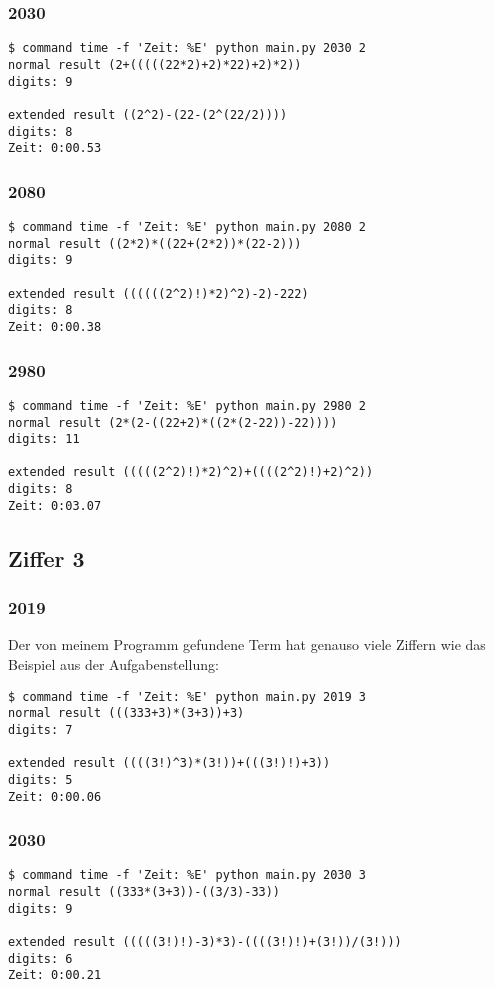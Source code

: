 \subsubsection{2030}
\begin{lstlisting}
$ command time -f 'Zeit: %E' python main.py 2030 2
normal result (2+(((((22*2)+2)*22)+2)*2))
digits: 9

extended result ((2^2)-(22-(2^(22/2))))
digits: 8
Zeit: 0:00.53
\end{lstlisting}
\subsubsection{2080}
\begin{lstlisting}
$ command time -f 'Zeit: %E' python main.py 2080 2
normal result ((2*2)*((22+(2*2))*(22-2)))
digits: 9

extended result ((((((2^2)!)*2)^2)-2)-222)
digits: 8
Zeit: 0:00.38
\end{lstlisting}
\subsubsection{2980}
\begin{lstlisting}
$ command time -f 'Zeit: %E' python main.py 2980 2
normal result (2*(2-((22+2)*((2*(2-22))-22))))
digits: 11

extended result (((((2^2)!)*2)^2)+((((2^2)!)+2)^2))
digits: 8
Zeit: 0:03.07
\end{lstlisting}
\subsection{Ziffer 3}
\subsubsection{2019}
Der von meinem Programm gefundene Term hat genauso viele Ziffern wie das Beispiel aus der Aufgabenstellung:
\begin{lstlisting}
$ command time -f 'Zeit: %E' python main.py 2019 3
normal result (((333+3)*(3+3))+3)
digits: 7

extended result ((((3!)^3)*(3!))+(((3!)!)+3))
digits: 5
Zeit: 0:00.06
\end{lstlisting}
\subsubsection{2030}
\begin{lstlisting}
$ command time -f 'Zeit: %E' python main.py 2030 3
normal result ((333*(3+3))-((3/3)-33))
digits: 9

extended result (((((3!)!)-3)*3)-((((3!)!)+(3!))/(3!)))
digits: 6
Zeit: 0:00.21
\end{lstlisting}
